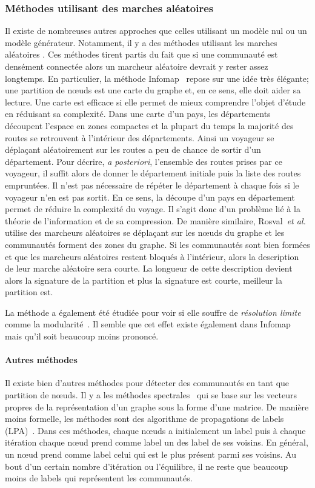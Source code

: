 \subsubsection{Méthodes utilisant des marches aléatoires}
Il existe de nombreuses autres approches que celles utilisant un modèle nul ou un modèle générateur.
Notamment, il y a des méthodes utilisant les marches aléatoires \cite{Pons2005,Rosvall2008}.
Ces méthodes tirent partis du fait que si une communauté est densément connectée alors un marcheur aléatoire devrait y rester assez longtemps.
En particulier, la méthode Infomap~\cite{Rosvall2008} repose sur une idée très élégante; une partition de n\oe uds est une carte du graphe et, en ce sens, elle doit aider sa lecture.
Une carte est efficace si elle permet de mieux comprendre l'objet d'étude en réduisant sa complexité.
Dans une carte d'un pays, les départements découpent l'espace en zones compactes et la plupart du temps la majorité des routes se retrouvent à l'intérieur des départements.
Ainsi un voyageur se déplaçant aléatoirement sur les routes a peu de chance de sortir d'un département.
Pour décrire, \emph{a posteriori}, l'ensemble des routes prises par ce voyageur, il suffit alors de donner le département initiale puis la liste des routes empruntées.
Il n'est pas nécessaire de répéter le département à chaque fois si le voyageur n'en est pas sortit.
En ce sens, la découpe d'un pays en département permet de réduire la complexité du voyage.
Il s'agit donc d'un problème lié à la théorie de l'information et de sa compression.
De manière similaire, Rosval~\emph{et al.} utilise des marcheurs aléatoires se déplaçant sur les n\oe uds du graphe et les communautés forment des zones du graphe.
Si les communautés sont bien formées et que les marcheurs aléatoires restent bloqués à l'intérieur, alors la description de leur marche aléatoire sera courte.
La longueur de cette description devient alors la signature de la partition et plus la signature est courte, meilleur la partition est.

La méthode a également été étudiée pour voir si elle souffre de \emph{résolution limite} comme la modularité~\cite{Kawamoto2015}.
Il semble que cet effet existe également dans Infomap mais qu'il soit beaucoup moins prononcé.

\paragraph{Autres méthodes}
Il existe bien d'autres méthodes pour détecter des communautés en tant que partition de n\oe uds.
Il y a les méthodes spectrales~\cite{Donetti2004,Mitrovic2009} qui se base sur les vecteurs propres de la représentation d'un graphe sous la forme d'une matrice.
De manière moins formelle, les méthodes sont des algorithme de propagations de labels (LPA)~\cite{Raghavan2007a,Li2014c}.
Dans ces méthodes, chaque n\oe uds a initialement un label puis à chaque itération chaque n\oe ud prend comme label un des label de ses voisins.
En général, un n\oe ud prend comme label celui qui est le plus présent parmi ses voisins.
Au bout d'un certain nombre d'itération ou l'équilibre, il ne reste que beaucoup moins de labels qui représentent les communautés.



